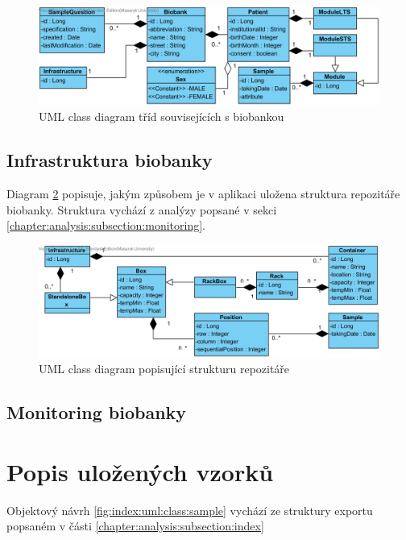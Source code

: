 \begin{figure}[h!]
\begin{center}
	\includegraphics[width=\textwidth]{BiobankView}
\caption{UML class diagram tříd souvisejících s biobankou}
\label{fig:index:uml:class:biobank}
\end{center}
\end{figure}

\subsection{Infrastruktura biobanky}
Diagram \ref{fig:index:uml:class:infrastructure} popisuje, jakým způsobem je v aplikaci uložena struktura repozitáře biobanky. Struktura vychází z analýzy popsané v sekci \ref{chapter:analysis:subsection:monitoring}.

\begin{figure}[h!]
\begin{center}
	\includegraphics[width=\textwidth]{InfrastructureView}
\caption{UML class diagram popisující strukturu repozitáře}
\label{fig:index:uml:class:infrastructure}
\end{center}
\end{figure}

\subsection{Monitoring biobanky}

\section{Popis uložených vzorků}
Objektový návrh \ref{fig:index:uml:class:sample} vychází ze struktury exportu popsaném v části \ref{chapter:analysis:subsection:index} 

